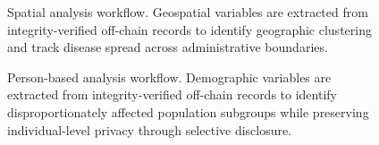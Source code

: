 \documentclass[AMA,LATO1COL]{WileyNJD-v2}
\begin{document}
\begin{figure}[!ht]
\centering
{}
\caption{Spatial analysis workflow. Geospatial variables are extracted from integrity-verified off-chain records to identify geographic clustering and track disease spread across administrative boundaries.}\label{fig:spatial}
\end{figure}

%
%
%


\begin{figure}[!ht]
\centering
{}
\caption{Person-based analysis workflow. Demographic variables are extracted from integrity-verified off-chain records to identify disproportionately affected population subgroups while preserving individual-level privacy through selective disclosure.}\label{fig:person}
\end{figure}

%
%
%
\end{document}

